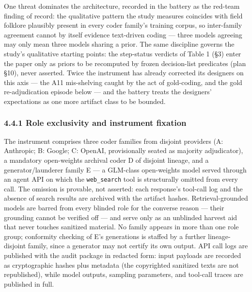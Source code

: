 One threat dominates the architecture, recorded in the battery as the red-team finding of record: the qualitative pattern the study measures coincides with field folklore plausibly present in every coder family's training corpus, so inter-family agreement cannot by itself evidence text-driven coding --- three models agreeing may only mean three models sharing a prior. The same discipline governs the study's qualitative starting points: the step-status verdicts of Table 1 (\S{}3) enter the paper only as priors to be recomputed by frozen decision-list predicates (plan \S{}10), never asserted. Twice the instrument has already corrected its designers on this axis --- the A11 mis-shelving caught by the act of gold-coding, and the gold re-adjudication episode below --- and the battery treats the designers' expectations as one more artifact class to be bounded.

\subsubsection{4.4.1 Role exclusivity and instrument fixation}\label{role-exclusivity-and-instrument-fixation}

The instrument comprises three coder families from disjoint providers (A: Anthropic; B: Google; C: OpenAI, provisionally seated as majority adjudicator), a mandatory open-weights archival coder D of disjoint lineage, and a generator/launderer family E --- a GLM-class open-weights model served through an agent API on which the \texttt{web\_search} tool is structurally omitted from every call. The omission is provable, not asserted: each response's tool-call log and the absence of search results are archived with the artifact hashes. Retrieval-grounded models are barred from every blinded role for the converse reason --- their grounding cannot be verified off --- and serve only as an unblinded harvest aid that never touches sanitized material. No family appears in more than one role group; conformity checking of E's generations is staffed by a further lineage-disjoint family, since a generator may not certify its own output. API call logs are published with the audit package in redacted form: input payloads are recorded as cryptographic hashes plus metadata (the copyrighted sanitized texts are not republished), while model outputs, sampling parameters, and tool-call traces are published in full.

